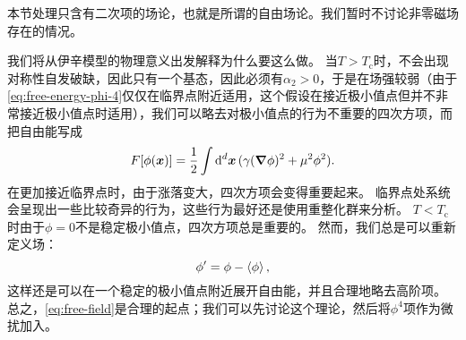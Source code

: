 \documentclass[hyperref, UTF8, a4paper]{ctexart}
\begin{document}
本节处理只含有二次项的场论，也就是所谓的自由场论。我们暂时不讨论非零磁场存在的情况。

我们将从伊辛模型的物理意义出发解释为什么要这么做。
当$T>T_\text{c}$时，不会出现对称性自发破缺，因此只有一个基态，因此必须有$\alpha_2 > 0$，于是在场强较弱（由于\eqref{eq:free-energy-phi-4}仅仅在临界点附近适用，这个假设在接近极小值点但并不非常接近极小值点时适用），我们可以略去对极小值点的行为不重要的四次方项，而把自由能写成
\begin{equation}
    F[\phi(\vb*{x})] = \frac{1}{2} \int \dd[d]{\vb*{x}} (\gamma (\grad{\phi})^2 + \mu^2 \phi^2).
    \label{eq:free-field}
\end{equation}
在更加接近临界点时，由于涨落变大，四次方项会变得重要起来。
临界点处系统会呈现出一些比较奇异的行为，这些行为最好还是使用重整化群来分析。
$T<T_\text{c}$时由于$\phi=0$不是稳定极小值点，四次方项总是重要的。
然而，我们总是可以重新定义场：
\[
    \phi' = \phi - \expval{\phi},
\]
这样还是可以在一个稳定的极小值点附近展开自由能，并且合理地略去高阶项。
总之，\eqref{eq:free-field}是合理的起点；我们可以先讨论这个理论，然后将$\phi^4$项作为微扰加入。
\end{document}
